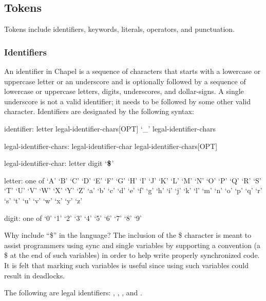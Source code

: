 \subsection{Tokens}
\label{Tokens}

Tokens include identifiers, keywords, literals, operators, and
punctuation.

\subsubsection{Identifiers}
\label{Identifiers}

An identifier in Chapel is a sequence of characters that starts with a
lowercase or uppercase letter or an underscore and is optionally
followed by a sequence of lowercase or uppercase letters, digits,
underscores, and dollar-signs.  A single underscore is not a valid
identifier; it needs to be followed by some other valid character.
Identifiers are designated by the following syntax:
\begin{syntax}
identifier:
  letter legal-identifier-chars[OPT]
  `_' legal-identifier-chars

legal-identifier-chars:
  legal-identifier-char legal-identifier-chars[OPT]

legal-identifier-char:
  letter
  digit
  `$\mbox{{\bf \$}}$'

letter: one of
  `A' `B' `C' `D' `E' `F' `G' `H' `I' `J' `K' `L' `M' `N' `O' `P' `Q' `R' `S' `T' `U' `V' `W' `X' `Y' `Z' `a' `b' `c' `d' `e' `f' `g' `h' `i' `j' `k' `l' `m'
                           `n' `o' `p' `q' `r' `s' `t' `u' `v' `w' `x' `y' `z'

digit: one of
  `0' `1' `2' `3' `4' `5' `6' `7' `8' `9'
\end{syntax}

\begin{rationale}
Why include ``\$'' in the language?  The inclusion of the \$ character
is meant to assist programmers using sync and single variables by
supporting a convention (a \$ at the end of such variables) in order
to help write properly synchronized code.  It is felt that marking
such variables is useful since using such variables could result in
deadlocks.
\end{rationale}

\begin{example}
The following are legal
identifiers: , ,
, and .
\end{example}

